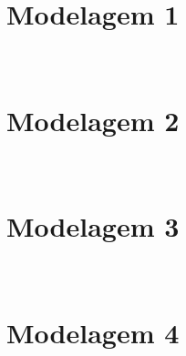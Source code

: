 
\

\section{Modelagem 1}
\label{mod1}



\

\section{Modelagem 2}
\label{mod2}



\

\section{Modelagem 3}
\label{mod3}



\

\section{Modelagem 4}
\label{mod4}


